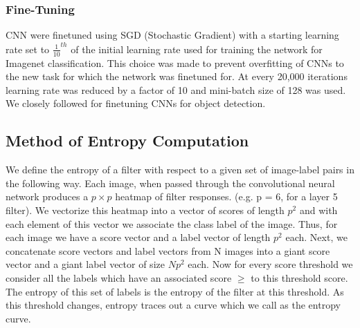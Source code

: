 \subsubsection{Fine-Tuning}
\label{sub:fine-train}
CNN were finetuned using SGD (Stochastic Gradient) with a starting learning rate set to $\frac{1}{10}^{th}$ of the initial learning rate used for training the network for Imagenet classification. This choice was made to prevent overfitting of CNNs to the new task for which the network was finetuned for. At every 20,000 iterations learning rate was reduced by a factor of 10 and mini-batch size of 128 was used. We closely followed \cite{Rcnn} for finetuning CNNs for object detection. 

\subsection{Method of Entropy Computation}
\label{sub:def-ent}
We define the entropy of a filter with respect to a given set of image-label pairs in the following way. Each image, when passed through the convolutional neural network produces a $p \times p$ heatmap of filter responses. (e.g. p = 6, for a layer 5 filter). We vectorize this heatmap into a vector of scores of length $p^2$ and with each element of this vector we associate the class label of the image. Thus, for each image we have a score vector and a label vector of length $p^2$ each. Next, we concatenate score vectors and label vectors from N images into a giant score vector and a giant label vector  of size $Np^2$ each. Now for every score threshold we consider all the labels which have an associated score $\geq$ to this threshold score. The entropy of this set of labels is the entropy of the filter at this threshold. As this threshold changes, entropy traces out a curve which we call as the entropy curve.  
